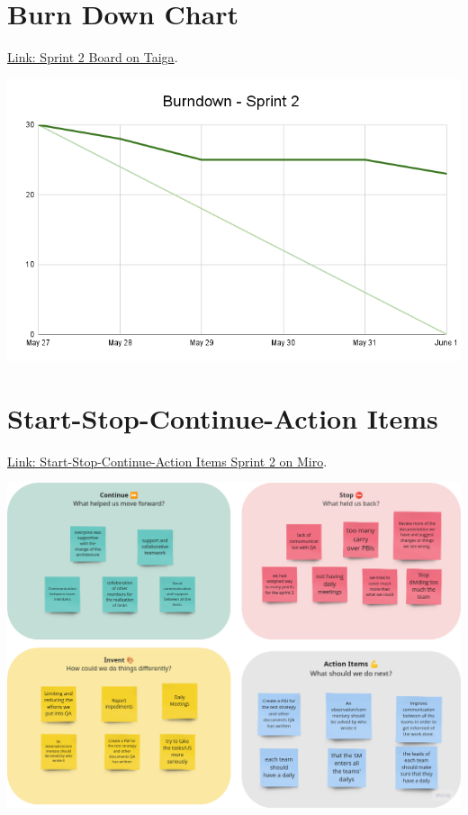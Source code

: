 \hypertarget{burndownchart-s2}{
\section{Burn Down Chart}\label{Burn Down Chart S2}}
\href{https://tree.taiga.io/project/joseluis-teran-coffeetime/taskboard/sprint-2-12274}{Link: Sprint 2 Board on Taiga}.

\includegraphics[width=\textwidth]{./artifacts/src/sprint-2/assets/Burndown-Sprint2.png}

\hypertarget{startstopcontinueactionitems-s2}{
\section{Start-Stop-Continue-Action Items}\label{Start-Stop-Continue-Action Items S2}}
\href{https://miro.com/app/board/uXjVKDO7l8M=/?moveToWidget=3458764590247693277&cot=14}{Link: Start-Stop-Continue-Action Items Sprint 2 on Miro}.

\includegraphics[width=\textwidth]{./artifacts/src/sprint-2/assets/retrospective-s2.png}


